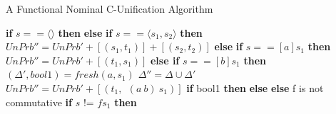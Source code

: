 \begin{frame}[allowframebreaks]{A Functional Nominal C-Unification Algorithm}
\begin{algorithmic}[1]
                \State \textbf{if} $s == \langle \rangle$ \textbf{then} 
                \State \hspace{8 \algorithmicxindent}
                \State \textbf{else} 
                \State \textbf{if} $s == \langle s_1, s_2 \rangle$ \textbf{then} 
                \State \hspace{8 \algorithmicxindent}
                $UnPrb'' = UnPrb' + [(s_1, t_1)] + [(s_2, t_2)]$
                \State \hspace{8 \algorithmicxindent}
                \State \textbf{else} 
                \State \textbf{if} $s == [a]s_1$ \textbf{then}        
                    \State \hspace{8 \algorithmicxindent}
                    $UnPrb'' = UnPrb' + [(t_1, s_1)]$
                    \State \hspace{8 \algorithmicxindent}
                \State \textbf{else if} $s == [b]s_1$ \textbf{then}        
                    \State \hspace{8 \algorithmicxindent}
                    $(\Delta', bool1) =  fresh(a, s_1)$ 
                    \State \hspace{8 \algorithmicxindent}
                    $\Delta'' = \Delta \cup \Delta'$ 
                    \State \hspace{8 \algorithmicxindent}
                    $UnPrb'' = UnPrb' + [(t_1, \ \ (a \ b) \ s_1)]$ 
                    \State \hspace{8 \algorithmicxindent}
                    \textbf{if} bool1 \textbf{then} 
                    \State \hspace{16 \algorithmicxindent}
                    \State \hspace{8 \algorithmicxindent}
                    \textbf{else} 
                \State \textbf{else} 
                    \State \hspace{8 \algorithmicxindent}
             \Comment f is not commutative
                \State \textbf{if} $s$ != $f s_1$ \textbf{then} 

\end{algorithmic}
\end{frame}
